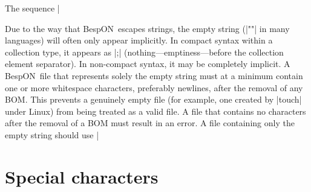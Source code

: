 \documentclass[11pt]{article}
\newcommand{\bespon}{BespON}
\begin{document}
The sequence |%

Due to the way that \bespon\ escapes strings, the empty string (|""| in many languages) will often only appear implicitly.  In compact syntax within a collection type, it appears as |;| (nothing---emptiness---before the collection element separator).  In non-compact syntax, it may be completely implicit.  A \bespon\ file that represents solely the empty string must at a minimum contain one or more whitespace characters, preferably newlines, after the removal of any BOM.  This prevents a genuinely empty file (for example, one created by |touch| under Linux) from being treated as a valid file.  A file that contains no characters after the removal of a BOM must result in an error.  A file containing only the empty string should use |%

\section{Special characters}
\end{document}
